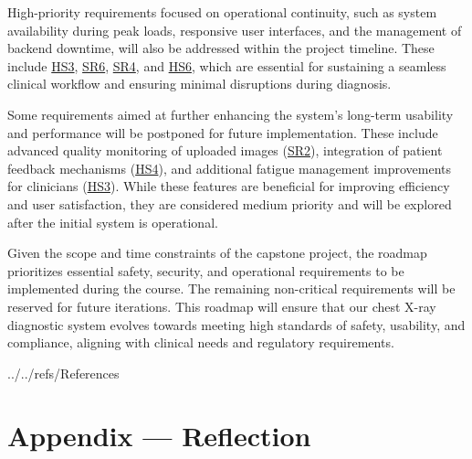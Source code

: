 \documentclass{article}
\begin{document}
\noindent High-priority requirements focused on operational continuity, such as system availability during peak loads, responsive user interfaces, and the management of backend downtime, will also be addressed within the project timeline. These include \hyperlink{HS3}{HS3}, \hyperlink{SR6}{SR6}, \hyperlink{SR4}{SR4}, and \hyperlink{HS6}{HS6}, which are essential for sustaining a seamless clinical workflow and ensuring minimal disruptions during diagnosis.
\vspace{0.2cm}

\noindent Some requirements aimed at further enhancing the system’s long-term usability and performance will be postponed for future implementation. These include advanced quality monitoring of uploaded images (\hyperlink{SR2}{SR2}), integration of patient feedback mechanisms (\hyperlink{HS4}{HS4}), and additional fatigue management improvements for clinicians (\hyperlink{HS3}{HS3}). While these features are beneficial for improving efficiency and user satisfaction, they are considered medium priority and will be explored after the initial system is operational.
\vspace{0.2cm}

\noindent Given the scope and time constraints of the capstone project, the roadmap prioritizes essential safety, security, and operational requirements to be implemented during the course. The remaining non-critical requirements will be reserved for future iterations. This roadmap will ensure that our chest X-ray diagnostic system evolves towards meeting high standards of safety, usability, and compliance, aligning with clinical needs and regulatory requirements.
\newpage{}

 {../../refs/References}
\newpage
\section*{Appendix --- Reflection}

\end{document}
